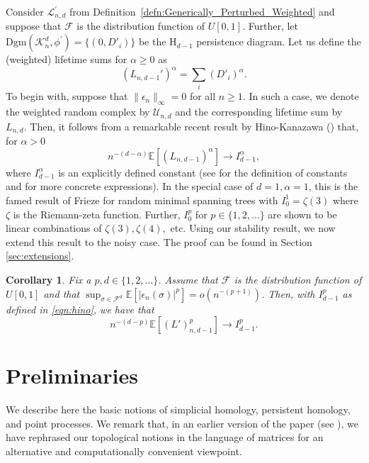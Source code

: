 \documentclass[12pt]{amsart}
\newcommand{\Exp}{\mathbb{E}}
\newcommand{\dy}[1]{\textcolor{magenta}{#1}}
\renewcommand{\dy}[1]{#1}
\newtheorem{corollary}[theorem]{Corollary}
\numberwithin{equation}{section}
\numberwithin{theorem}{section}
\newcommand{\Dgm}{\mathrm{Dgm}}
\newcommand{\Hg}{\mathrm{H}}
\newcommand{\1}{\mathbf{1}}
\def\F{\mathcal{F}}
\def\sF{\mathscr{F}}
\def\U{\mathcal{U}}
\def\Lp{\mathcal{L}^\prime}
\def\K{\mathcal{K}}
\def\phip{\phi^\prime}
\begin{document}
Consider $\Lp_{n, d}$ from Definition~\ref{defn:Generically_Perturbed_Weighted} and suppose that $\sF$ is the distribution function of $U[0, 1].$ Further, let $\Dgm(\K_n^d,\phip) = \{(0,D'_i)\}$ be the $\Hg_{d-1}$ persistence diagram. Let us define the (weighted) lifetime sums for $\alpha \geq 0$ as
%
\begin{equation}
\label{eqn:lifetimeSum}
%
(L_{n,d-1}')^{\alpha} = \sum_i (D'_i)^{\alpha}.
\end{equation}
%
To begin with, suppose that $\|\epsilon_n\|_{\infty} = 0$ for all $n \geq 1$. \dy{In such a case, we denote the weighted random complex by $\U_{n,d}$ and the corresponding lifetime sum by $L_{n,d}$.} Then, it follows from a remarkable recent result by Hino-Kanazawa (\cite[Theorem 4.11]{Hino2018}) that, for $\alpha > 0$
%
\begin{equation}
\label{eqn:hino}
n^{-(d-\alpha)}\Exp[(L_{n,d-1})^{\alpha}] \to I^{\alpha}_{d-1},
\end{equation}
%
where $I^{\alpha}_{d-1}$ is an explicitly defined constant (see \cite[(4.10)]{Hino2018} for the definition of constants and \cite[Section 4.4]{Hino2018} for more concrete expressions).  In the special case of $d = 1, \alpha = 1$, this is the famed result of Frieze \cite{Frieze85} for random minimal spanning trees with $I^1_0 = \zeta(3)$ where $\zeta$ is the Riemann-zeta function. Further, $I^p_0$ for $p \in \{1,2,\ldots\}$ are shown to be linear combinations of $\zeta(3), \zeta(4),$ etc. Using our stability result, we now extend this result to the noisy case. The proof can be found in Section \ref{sec:extensions}.
%
\begin{corollary}
\label{thm:lifetimesum}
Fix a $p,d \in \{1,2,\ldots\}$. Assume that $\sF$ is the distribution function of $U[0,1]$ and that $ \sup_{\sigma \in \F^d} \Exp[|\epsilon_n(\sigma)|^p] = o(n^{-(p+1)})$. Then, with $I^p_{d-1}$ as defined in \eqref{eqn:hino}, we have that
%
\[ n^{-(d-p)}\Exp[(L')^p_{n,d-1}] \to I^p_{d-1}.\]
%
\end{corollary}
%	

\section{Preliminaries}
\label{sec:prelim}

We describe here the basic notions of simplicial homology, persistent homology, and point processes. We remark that, in an earlier version of the paper (see \cite[Appendix B]{Skraba17}), we have rephrased our topological notions in the language of matrices for \dy{an alternative and computationally convenient viewpoint.}
\end{document}
